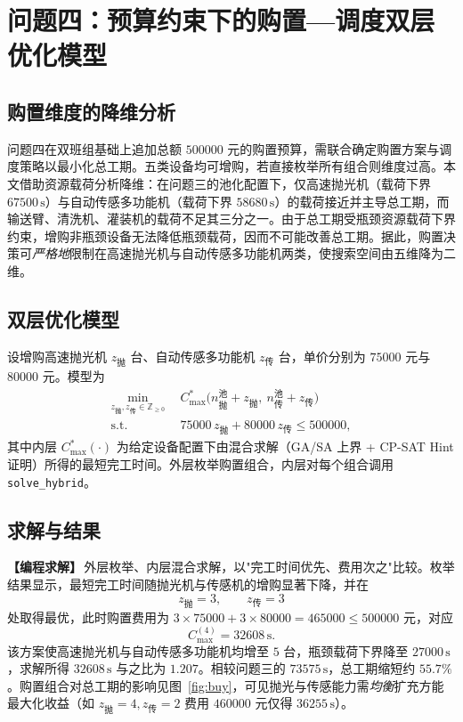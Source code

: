 \documentclass[12pt,a4paper]{ctexart}
\begin{document}
\section{问题四：预算约束下的购置—调度双层优化模型}

\subsection{购置维度的降维分析}
问题四在双班组基础上追加总额 $500000$ 元的购置预算，需联合确定购置方案与调度策略以最小化总工期。五类设备均可增购，若直接枚举所有组合则维度过高。本文借助资源载荷分析降维：在问题三的池化配置下，仅高速抛光机（载荷下界 $67500\,\mathrm{s}$）与自动传感多功能机（载荷下界 $58680\,\mathrm{s}$）的载荷接近并主导总工期，而输送臂、清洗机、灌装机的载荷不足其三分之一。由于总工期受瓶颈资源载荷下界约束，增购非瓶颈设备无法降低瓶颈载荷，因而不可能改善总工期。据此，购置决策可\emph{严格地}限制在高速抛光机与自动传感多功能机两类，使搜索空间由五维降为二维。

\subsection{双层优化模型}
设增购高速抛光机 $z_{\text{抛}}$ 台、自动传感多功能机 $z_{\text{传}}$ 台，单价分别为 $75000$ 元与 $80000$ 元。模型为
\begin{align}
\min_{z_{\text{抛}},z_{\text{传}}\in\mathbb{Z}_{\ge0}}~~ & C_{\max}^{\ast}\big(n_{\text{抛}}^{\text{池}}+z_{\text{抛}},\ n_{\text{传}}^{\text{池}}+z_{\text{传}}\big) \\
\text{s.t.}~~ & 75000\,z_{\text{抛}} + 80000\,z_{\text{传}} \le 500000,
\end{align}
其中内层 $C_{\max}^{\ast}(\cdot)$ 为给定设备配置下由混合求解（GA/SA 上界 + CP-SAT Hint 证明）所得的最短完工时间。外层枚举购置组合，内层对每个组合调用 \texttt{solve\_hybrid}。

\subsection{求解与结果}
\noindent\textbf{【编程求解】}\,外层枚举、内层混合求解，以"完工时间优先、费用次之"比较。枚举结果显示，最短完工时间随抛光机与传感机的增购显著下降，并在
\[
z_{\text{抛}}=3,\qquad z_{\text{传}}=3
\]
处取得最优，此时购置费用为 $3\times75000+3\times80000=465000\le500000$ 元，对应
\[
C_{\max}^{(4)}=32608\,\mathrm{s}.
\]
该方案使高速抛光机与自动传感多功能机均增至 $5$ 台，瓶颈载荷下界降至 $27000\,\mathrm{s}$，求解所得 $32608\,\mathrm{s}$ 与之比为 $1.207$。相较问题三的 $73575\,\mathrm{s}$，总工期缩短约 $55.7\%$。购置组合对总工期的影响见图~\ref{fig:buy}，可见抛光与传感能力需\emph{均衡}扩充方能最大化收益（如 $z_{\text{抛}}=4,z_{\text{传}}=2$ 费用 $460000$ 元仅得 $36255\,\mathrm{s}$）。
\end{document}
